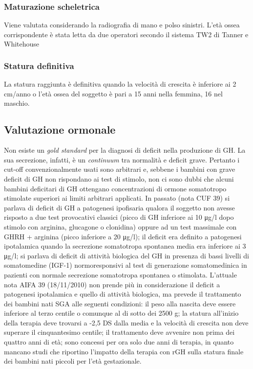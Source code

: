 \subsubsection*{Maturazione scheletrica}
Viene valutata considerando la radiografia di mano e polso sinistri. L'età ossea corrispondente è stata letta da due operatori secondo il sistema TW2 di Tanner e Whitehouse%


\subsubsection*{Statura definitiva}
La statura raggiunta è definitiva quando la velocità di crescita è inferiore ai 2 cm/anno o l'età ossea del soggetto è pari a 15 anni nella femmina, 16 nel maschio.


\clearpage

\subsection{Valutazione ormonale}

Non esiste un \emph{gold standard} per la diagnosi di deficit nella produzione di GH\cite{gh2003update}. La sua secrezione, infatti, è un \emph{continuum} tra normalità e deficit grave. Pertanto i cut-off convenzionalmente usati sono arbitrari e, sebbene i bambini con grave deficit di GH non rispondano ai test di stimolo, non ci sono dubbi che alcuni bambini deficitari di GH ottengano concentrazioni di ormone somatotropo stimolate superiori ai limiti arbitrari applicati.
In passato (nota CUF 39) si parlava di deficit di GH a patogenesi ipofisaria qualora il soggetto non avesse risposto a due test provocativi classici (picco di GH inferiore ai 10 \unit{\micro g}/l dopo stimolo con arginina, glucagone o clonidina) oppure ad un test massimale con GHRH + arginina (picco inferiore a 20 \unit{\micro g}/l); il deficit era definito a patogenesi ipotalamica quando la secrezione somatotropa spontanea media era inferiore ai 3 \unit{\micro g}/l; si parlava di deficit di attività biologica del GH in presenza di bassi livelli di somatomedine (IGF-1) normoresponsivi al test di generazione somatomedinica in pazienti con normale secrezione somatotropa spontanea o stimolata.
L'attuale nota AIFA 39 (18/11/2010) non prende più in considerazione il deficit a patogenesi ipotalamica e quello di attività biologica, ma prevede il trattamento dei bambini nati SGA alle seguenti condizioni: il peso alla nascita deve essere inferiore al terzo centile o comunque al di sotto dei 2500 g; la statura all'inizio della terapia deve trovarsi a -2,5 DS dalla media e la velocità di crescita non deve superare il cinquantesimo centile; il trattamento deve avvenire non prima dei quattro anni di età; sono concessi per ora solo due anni di terapia, in quanto mancano studi che riportino l'impatto della terapia con rGH sulla statura finale dei bambini nati piccoli per l'età gestazionale.

